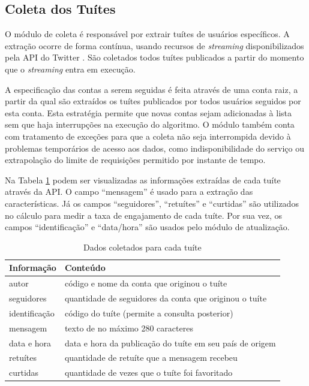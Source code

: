 \documentclass[oneside,openright,12pt]{ufsm_2015} %
\begin{document}

\subsection{Coleta dos Tuítes}

    \par O módulo de coleta é responsável por extrair tuítes de usuários específicos. A extração ocorre de forma contínua, usando recursos de \textit{streaming} disponibilizados pela API do Twitter \cite{site:twitter-api}. São coletados todos tuítes publicados a partir do momento que o \textit{streaming} entra em execução.
    
    \par A especificação das contas a serem seguidas é feita através de uma conta raiz, a partir da qual são extraídos os tuítes publicados por todos usuários seguidos por esta conta. Esta estratégia permite que novas contas sejam adicionadas à lista sem que haja interrupções na execução do algoritmo. O módulo também conta com tratamento de exceções para que a coleta não seja interrompida devido à problemas temporários de acesso aos dados, como indisponibilidade do serviço ou extrapolação do limite de requisições permitido por instante de tempo.
    
    \par Na Tabela \ref{tab:dados-coleta} podem ser visualizadas as informações extraídas de cada tuíte através da API. O campo ``mensagem'' é usado para a extração das características. Já os campos ``seguidores'', ``retuítes'' e ``curtidas'' são utilizados no cálculo para medir a taxa de engajamento de cada tuíte. Por sua vez, os campos ``identificação'' e ``data/hora'' são usados pelo módulo de atualização.
    
    \begin{table}[ht]
    \centering
    \caption{Dados coletados para cada tuíte}
    \label{tab:dados-coleta}
    \begin{tabular}{|l|l|}
    \hline
    \textbf{Informação} & \textbf{Conteúdo} \\ \hline
    autor &  código e nome da conta que originou o tuíte \\ \hline
    seguidores &  quantidade de seguidores da conta que originou o tuíte \\ \hline
    identificação & código do tuíte (permite a consulta posterior) \\ \hline
    mensagem & texto de no máximo 280 caracteres \\ \hline
    data e hora & data e hora da publicação do tuíte em seu país de origem \\ \hline
    retuítes & quantidade de retuíte que a mensagem recebeu \\ \hline
    curtidas & quantidade de vezes que o tuíte foi favoritado \\ \hline
    \end{tabular}
    \end{table}
    
\end{document}
